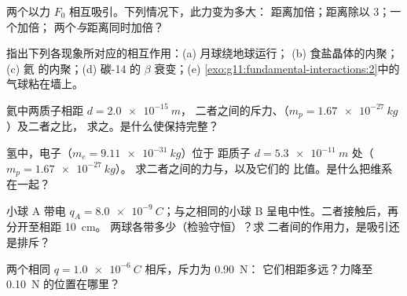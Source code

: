 \begin{exercise}[$\star$]\label{exo:g11:fundamental-interactions:4}
两个以力 $F_0$ 相互吸引。下列情况下，此力变为多大：
距离加倍；距离除以 $3$；一个加倍；
两个\emph{与}距离同时加倍？
\end{exercise}

\begin{exercise}[$\star$]\label{exo:g11:fundamental-interactions:5}
指出下列各现象所对应的相互作用：(a) 月球绕地球运行；
(b) 食盐晶体的内聚；(c) 氦
的内聚；(d) 碳-14 的 $\beta$ 衰变；(e)
\cref{exo:g11:fundamental-interactions:2}中的气球粘在墙上。
\end{exercise}

\begin{exercise}[$\star\star$]\label{exo:g11:fundamental-interactions:6}
氦中两质子相距 $d = \qty{2.0e-15}{m}$，
二者之间的斥力、（$m_p = \qty{1.67e-27}{kg}$）及二者之比，
求之。是什么使保持完整？
\end{exercise}

\begin{exercise}[$\star\star$]\label{exo:g11:fundamental-interactions:7}
氢中，电子（$m_e = \qty{9.11e-31}{kg}$）位于
距质子 $d = \qty{5.3e-11}{m}$ 处（$m_p = \qty{1.67e-27}{kg}$）。
求二者之间的力与，以及它们的
比值。是什么把维系在一起？
\end{exercise}

\begin{exercise}[$\star\star$]\label{exo:g11:fundamental-interactions:8}
小球 A 带电 $q_A = \qty{+8.0e-9}{C}$；与之相同的小球 B
呈电中性。二者接触后，再分开至相距 \qty{10}{cm}。
两球各带多少（检验守恒）？求
二者间的作用力，是吸引还是排斥？
\end{exercise}

\begin{exercise}[$\star\star$]\label{exo:g11:fundamental-interactions:9}
两个相同 $q = \qty{1.0e-6}{C}$ 相斥，斥力为 \qty{0.90}{N}：
它们相距多远？力降至 \qty{0.10}{N} 的位置在哪里？
\end{exercise}

